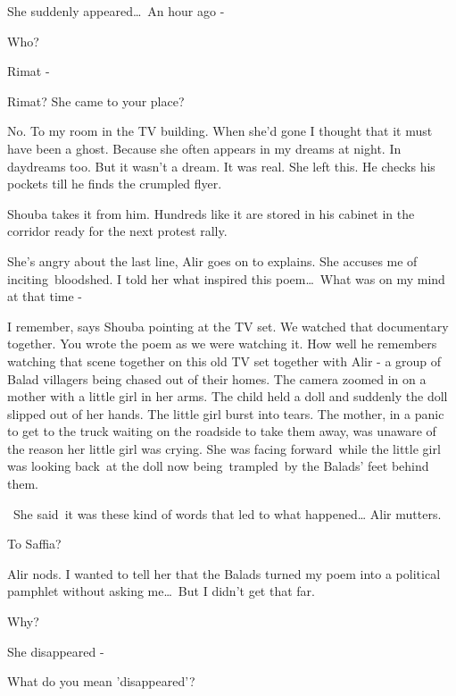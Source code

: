 \documentclass[twoside,11pt]{book}
\begin{document}
{\textquotedbl}She suddenly appeared{\dots}\ An hour ago -{\textquotedbl} 

{\textquotedbl}Who?{\textquotedbl} 

{\textquotedbl}Rimat -{\textquotedbl} 

{\textquotedbl}Rimat? She came to your place?{\textquotedbl} 

{\textquotedbl}No. To my room in the TV building. When she'd gone I thought that it must have been a ghost. Because she
often appears in my dreams at night. In daydreams too. But it wasn't a dream. It was real. She left
this.{\textquotedbl} He checks his pockets till he finds the crumpled flyer.

Shouba takes it from him. Hundreds like it are stored in his cabinet in the corridor ready for the next protest rally.\ 

{\textquotedbl}She's angry about the last line,{\textquotedbl} Alir goes on to explains. {\textquotedbl}She accuses me
of inciting~bloodshed. I told her what inspired this poem{\dots}\ What was on my mind at that time -{\textquotedbl}

{\textquotedbl}I remember,{\textquotedbl} says Shouba pointing at the TV set. {\textquotedbl}We watched that documentary
together. You wrote the poem as we were watching it.{\textquotedbl} How well he remembers watching that scene together
on this old TV set together with Alir {}-  a group of Balad villagers being chased out of their homes. The camera
zoomed in on a mother with a little girl in her arms. The child held a doll and suddenly the doll slipped out of her
hands. The little girl burst into tears. The mother, in a panic to get to the truck waiting on the roadside to take
them away, was unaware of the reason her little girl was crying. She was facing forward~while the little girl was
looking back~at the doll now being~trampled~by the Balads' feet behind them.

~{\textquotedbl}She said~it was these kind of words that led to what happened{\dots}{\textquotedbl} Alir mutters.

{\textquotedbl}To Saffia?{\textquotedbl} 

Alir nods. {\textquotedbl}I wanted to tell her that the Balads turned my poem into a political pamphlet without asking
me{\dots}\ But I didn't get that far.{\textquotedbl} 

{\textquotedbl}Why?{\textquotedbl} 

{\textquotedbl}She disappeared -{\textquotedbl} 

{\textquotedbl}What do you mean 'disappeared'?{\textquotedbl} 
\end{document}
